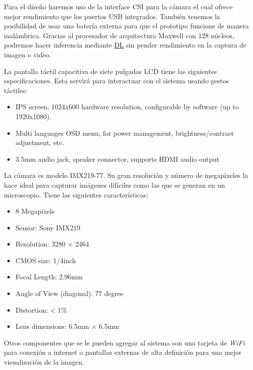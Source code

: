 Para el diseño haremos uso de la interface CSI para la cámara el cual ofrece
mejor rendimiento que los puertos USB integrados. También tenemos la posibilidad
de usar una batería externa para que el prototipo funcione de manera
inalámbrica. Gracias al procesador de arquitectura Maxwell con 128 núcleos,
podremos hacer inferencia mediante \hyperlink{abbr}{DL} sin pender rendimiento
en la captura de imagen o video.

La pantalla táctil capacitiva de siete pulgadas LCD tiene las siguientes
especificaciones. Esta servirá para interactuar con el sistema usando gestos
táctiles:

\begin{itemize}
    \item IPS screen, 1024x600 hardware resolution, configurable by software (up
    to 1920x1080).
    \item Multi languages OSD menu, for power management, brightness/contrast adjustment, etc. 
    \item 3.5mm audio jack, speaker connector, supports HDMI audio output
\end{itemize}

La cámara es modelo IMX219-77. Su gran resolución y número de megapíxeles la
hace ideal para capturar imágenes difíciles como las que se generan en un
microscopio. Tiene las siguientes características:

\begin{minipage}{\textwidth}
\begin{itemize}
    \item 8 Megapixels
    \item Sensor: Sony IMX219
    \item Resolution: 3280 × 2464
    \item CMOS size: 1/4inch
    \item Focal Length: 2.96mm
    \item Angle of View (diagonal): 77 degree
    \item Distortion: < 1\%
    \item Lens dimensions: 6.5mm × 6.5mm
\end{itemize}
\end{minipage}

Otros componentes que se le pueden agregar al sistema son una tarjeta de
\emph{WiFi} para conexión a internet o pantallas externas de alta definición
para una mejor visualización de la imagen.


